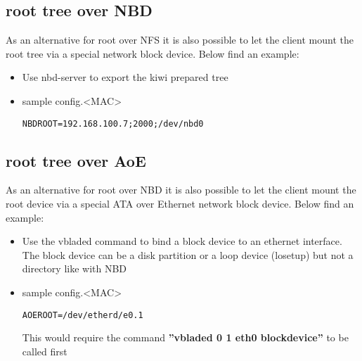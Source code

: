 \subsection{root tree over NBD}

As an alternative for root over NFS it is also possible to
let the client mount the root tree via a special network block
device. Below find an example:

\begin{itemize}
\item Use nbd-server to export the kiwi prepared tree
\item sample config.<MAC>

\begin{Command}{12cm}
\begin{verbatim}
NBDROOT=192.168.100.7;2000;/dev/nbd0
\end{verbatim}
\end{Command}
\end{itemize}

\subsection{root tree over AoE}

As an alternative for root over NBD it is also possible to
let the client mount the root device via a special ATA over
Ethernet network block device. Below find an example:

\begin{itemize}
\item Use the vbladed command to bind a block device to an
      ethernet interface. The block device can be a disk
      partition or a loop device (losetup) but not a directory 
      like with NBD
\item sample config.<MAC>

\begin{Command}{12cm}
\begin{verbatim}
AOEROOT=/dev/etherd/e0.1
\end{verbatim}
\end{Command}

      This would require the command
      \textbf{''vbladed 0 1 eth0 blockdevice''}
      to be called first
\end{itemize}

